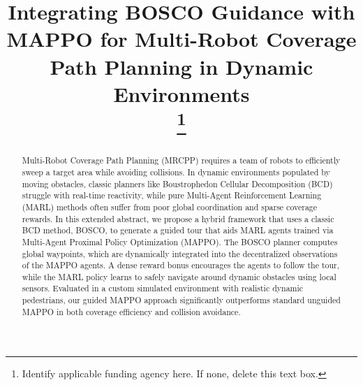 \documentclass[conference]{IEEEtran}
\begin{document}
\title{Integrating BOSCO Guidance with MAPPO for Multi-Robot Coverage Path Planning in Dynamic Environments\\
\thanks{Identify applicable funding agency here. If none, delete this text box.}
}

\author{
\and
{}
\and
{}
}

\maketitle

\begin{abstract}
Multi-Robot Coverage Path Planning (MRCPP) requires a team of robots to efficiently sweep a target area while avoiding collisions. In dynamic environments populated by moving obstacles, classic planners like Boustrophedon Cellular Decomposition (BCD) struggle with real-time reactivity, while pure Multi-Agent Reinforcement Learning (MARL) methods often suffer from poor global coordination and sparse coverage rewards. In this extended abstract, we propose a hybrid framework that uses a classic BCD method, BOSCO, to generate a guided tour that aids MARL agents trained via Multi-Agent Proximal Policy Optimization (MAPPO). The BOSCO planner computes global waypoints, which are dynamically integrated into the decentralized observations of the MAPPO agents. A dense reward bonus encourages the agents to follow the tour, while the MARL policy learns to safely navigate around dynamic obstacles using local sensors. Evaluated in a custom simulated environment with realistic dynamic pedestrians, our guided MAPPO approach significantly outperforms standard unguided MAPPO in both coverage efficiency and collision avoidance.
\end{abstract}
\end{document}

